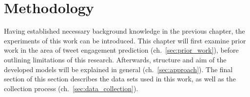 \section{Methodology}
\label{ch:methodology}

Having established necessary background knowledge in the previous chapter,
the experiments of this work can be introduced.
This chapter will first examine prior work in the area of tweet engagement
prediction (ch.~\ref{sec:prior_work}), before outlining limitations of this
research.
Afterwards, structure and aim of the developed models will be explained in general (ch.~\ref{sec:approach}).
The final section of this section describes the data sets used in this work,
as well as the collection process (ch.~\ref{sec:data_collection}).









